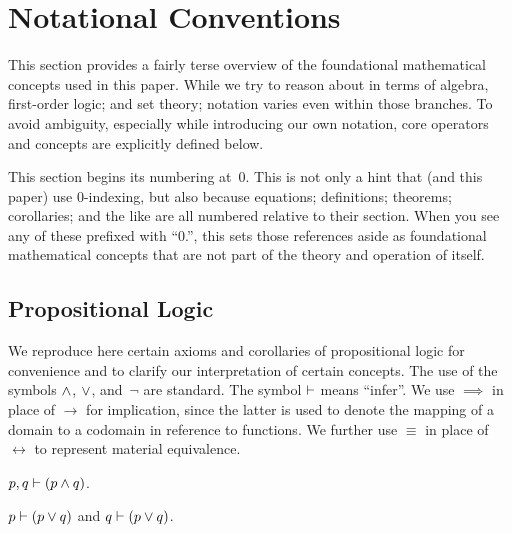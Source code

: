 
\section{Notational Conventions}
This section provides a fairly terse overview of the foundational
  mathematical concepts used in this paper.
While we try to reason about \tame{} in terms of algebra,
  first-order logic;
  and set theory;
    notation varies even within those branches.
To avoid ambiguity,
  especially while introducing our own notation,
  core operators and concepts are explicitly defined below.

This section begins its numbering at~0.
This is not only a hint that \tame{} (and this paper) use 0-indexing,
  but also because equations; definitions; theorems; corollaries; and the
  like are all numbered relative to their section.
When you see any of these prefixed with ``0.'',
  this sets those references aside as foundational mathematical concepts
    that are not part of the theory and operation of \tame{} itself.


\subsection{Propositional Logic}
%
%
\indexsym{}
%
We reproduce here certain axioms and corollaries of propositional logic for
  convenience and to clarify our interpretation of certain concepts.
The use of the symbols $\wedge$, $\vee$, and~$\neg$ are standard.
\indexsym{}
The symbol $\vdash$ means ``infer''.
We use $\implies$ in place of $\rightarrow$ for implication,
  since the latter is used to denote the mapping of a domain to a codomain
  in reference to functions.
We further use $\equiv$ in place of $\leftrightarrow$ to represent material
  equivalence.

\indexsym{}
\begin{definition}
  $p,q \vdash (p\wedge q)$.
\end{definition}

\indexsym{}
\begin{definition}
  $p \vdash (p\vee q)$ and $q \vdash (p\vee q)$.
\end{definition}

